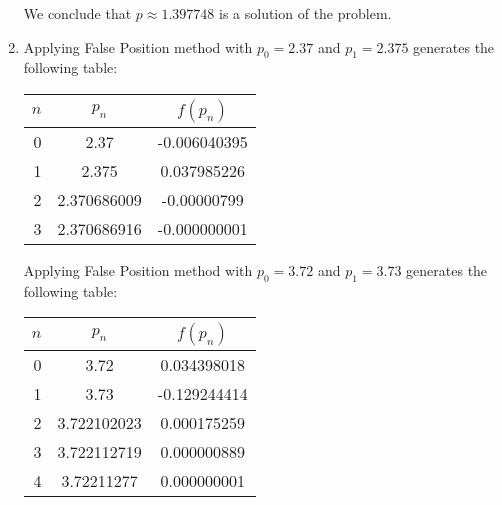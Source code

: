 \documentclass[../../../../Assignments]{subfiles}
\begin{document}
\begin{solution}
\begin{enumerate}[label = \alph*)]
            We conclude that \(p \approx \num{1.397748}\) is a solution of the
            problem.

        \item Applying False Position method with \(p_0 = \num{2.37}\) and \(p_1
            = \num{2.375}\) generates the following table:

            \begin{table}[H]
                \centering
                \begin{tabular}{r S[table-format=1.9] S[table-format=-1.9]}
                    \toprule
                    \(n\)  &   {\(p_n\)}   &  {\(f(p_n)\)}  \\
                      &  2.37         &  -0.006040395  \\
                        1  &  2.375        &   0.037985226  \\
                        2  &  2.370686009  &  -0.00000799   \\
                        3  &  2.370686916  &  -0.000000001  \\
                    \bottomrule
                \end{tabular}
            \end{table}

            Applying False Position method with \(p_0 = \num{3.72}\) and \(p_1 =
            \num{3.73}\) generates the following table:

            \begin{table}[H]
                \centering
                \begin{tabular}{r S[table-format=1.9] S[table-format=-1.9]}
                    \toprule
                    \(n\)  &   {\(p_n\)}   &  {\(f(p_n)\)}  \\
                      &  3.72         &   0.034398018  \\
                        1  &  3.73         &  -0.129244414  \\
                        2  &  3.722102023  &   0.000175259  \\
                        3  &  3.722112719  &   0.000000889  \\
                        4  &  3.72211277   &   0.000000001  \\
                    \bottomrule
                \end{tabular}
            \end{table}


\end{enumerate}
\end{solution}
\end{document}
